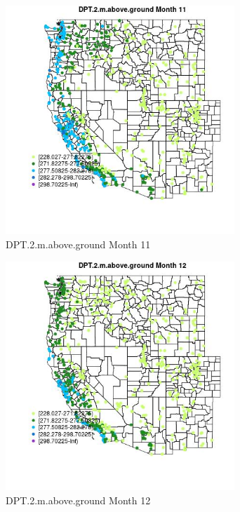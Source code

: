 \begin{figure} 
\centering  
\includegraphics[width=0.77\textwidth]{Code_Outputs/Report_ML_input_PM25_Step4_part_f_de_duplicated_aveswNAs_MapObsMo11DPT2maboveground.jpg} 
\caption{\label{fig:Report_ML_input_PM25_Step4_part_f_de_duplicated_aveswNAsMapObsMo11DPT2maboveground}DPT.2.m.above.ground Month 11} 
\end{figure} 
 

\begin{figure} 
\centering  
\includegraphics[width=0.77\textwidth]{Code_Outputs/Report_ML_input_PM25_Step4_part_f_de_duplicated_aveswNAs_MapObsMo12DPT2maboveground.jpg} 
\caption{\label{fig:Report_ML_input_PM25_Step4_part_f_de_duplicated_aveswNAsMapObsMo12DPT2maboveground}DPT.2.m.above.ground Month 12} 
\end{figure} 
 

